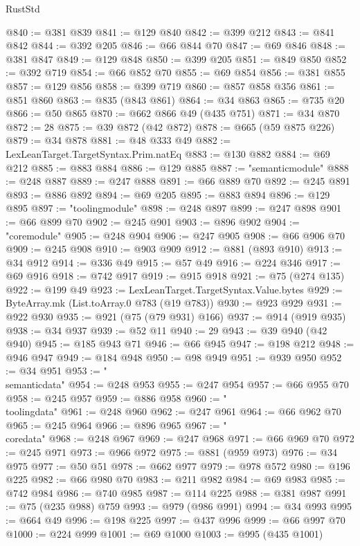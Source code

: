 \begin{lexlean}{RustStd}
\begin{coremodule}
{\begin{coremodule}
{{{{{{{{{{{{{{{{{{{{{{{{{{{{{{{{{{{{{{{{{{{@840 := @381 @839
@841 := @129 @840
@842 := @399 @212
@843 := @841 @842
@844 := @392 @205
@846 := @66 @844 @70
@847 := @69 @846
@848 := @381 @847
@849 := @129 @848
@850 := @399 @205
@851 := @849 @850
@852 := @392 @719
@854 := @66 @852 @70
@855 := @69 @854
@856 := @381 @855
@857 := @129 @856
@858 := @399 @719
@860 := @857 @858 @356
@861 := @851 @860
@863 := @835 (@843 @861)
@864 := @34 @863
@865 := @735 @20
@866 := @50 @865
@870 := @662 @866 @49 (@435 @751)
@871 := @34 @870
@872 := 28
@875 := @39 @872 (@42 @872)
@878 := @665 (@59 @875 @226)
@879 := @34 @878
@881 := @48 @333 @49
@882 := LexLeanTarget.TargetSyntax.Prim.natEq
@883 := @130 @882
@884 := @69 @212
@885 := @883 @884
@886 := @129 @885
@887 := "semanticmodule"
@888 := @248 @887
@889 := @247 @888
@891 := @66 @889 @70
@892 := @245 @891
@893 := @886 @892
@894 := @69 @205
@895 := @883 @894
@896 := @129 @895
@897 := "toolingmodule"
@898 := @248 @897
@899 := @247 @898
@901 := @66 @899 @70
@902 := @245 @901
@903 := @896 @902
@904 := "coremodule"
@905 := @248 @904
@906 := @247 @905
@908 := @66 @906 @70
@909 := @245 @908
@910 := @903 @909
@912 := @881 (@893 @910)
@913 := @34 @912
@914 := @336 @49
@915 := @57 @49
@916 := @224 @346
@917 := @69 @916
@918 := @742 @917
@919 := @915 @918
@921 := @75 (@274 @135)
@922 := @199 @49
@923 := LexLeanTarget.TargetSyntax.Value.bytes
@929 := ByteArray.mk (List.toArray.{0} @783 (@19 @783))
@930 := @923 @929
@931 := @922 @930
@935 := @921 (@75 (@79 @931) @166)
@937 := @914 (@919 @935)
@938 := @34 @937
@939 := @52 @11
@940 := 29
@943 := @39 @940 (@42 @940)
@945 := @185 @943 @71
@946 := @66 @945
@947 := @198 @212
@948 := @946 @947
@949 := @184 @948
@950 := @98 @949
@951 := @939 @950
@952 := @34 @951
@953 := "\\semanticdata"
@954 := @248 @953
@955 := @247 @954
@957 := @66 @955 @70
@958 := @245 @957
@959 := @886 @958
@960 := "\\toolingdata"
@961 := @248 @960
@962 := @247 @961
@964 := @66 @962 @70
@965 := @245 @964
@966 := @896 @965
@967 := "\\coredata"
@968 := @248 @967
@969 := @247 @968
@971 := @66 @969 @70
@972 := @245 @971
@973 := @966 @972
@975 := @881 (@959 @973)
@976 := @34 @975
@977 := @50 @51
@978 := @662 @977
@979 := @978 @572
@980 := @196 @225
@982 := @66 @980 @70
@983 := @211 @982
@984 := @69 @983
@985 := @742 @984
@986 := @740 @985
@987 := @114 @225
@988 := @381 @987
@991 := @75 (@235 @988) @759
@993 := @979 (@986 @991)
@994 := @34 @993
@995 := @664 @49
@996 := @198 @225
@997 := @437 @996
@999 := @66 @997 @70
@1000 := @224 @999
@1001 := @69 @1000
@1003 := @995 (@435 @1001)
}}}}}}}}}}}}}}}}}}}}}}}}}}}}}}}}}}}}}}}}}}}
\end{coremodule}}
\end{coremodule}
\end{lexlean}
